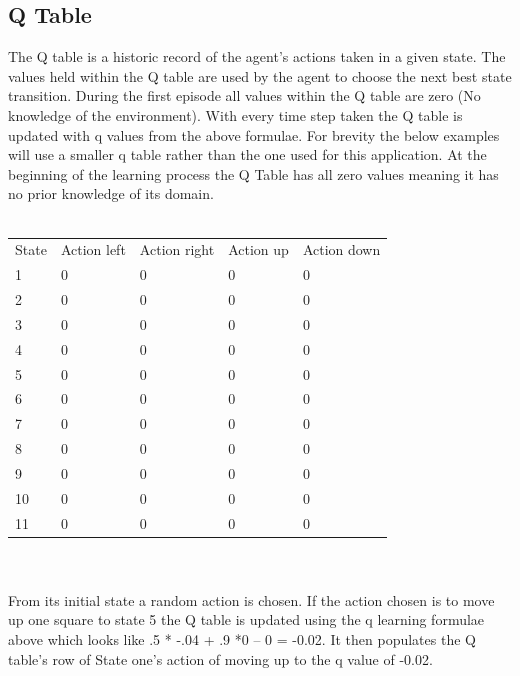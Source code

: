 \subsection{Q Table}
The Q table is a historic record of the agent’s actions taken in a given state. The values held within the Q table are used by the agent to choose the next best state transition. During the first episode all values within the Q table are zero (No knowledge of the environment). With every time step taken the Q table is updated with q values from the above formulae. For brevity the below examples will use a smaller q table rather than the one used for this application.
At the beginning of the learning process the Q Table has all zero values meaning it has no prior knowledge of its domain.
\\
\\
\begin{tabular}{lllll}
State & Action left & Action right & Action up & Action down \\
1     & 0           & 0            & 0         & 0           \\
2     & 0           & 0            & 0         & 0           \\
3     & 0           & 0            & 0         & 0           \\
4     & 0           & 0            & 0         & 0           \\
5     & 0           & 0            & 0         & 0           \\
6     & 0           & 0            & 0         & 0           \\
7     & 0           & 0            & 0         & 0           \\
8     & 0           & 0            & 0         & 0           \\
9     & 0           & 0            & 0         & 0           \\
10    & 0           & 0            & 0         & 0           \\
11    & 0           & 0            & 0         & 0          
\end{tabular}
\\
\\
From its initial state a random action is chosen. If the action chosen is to move up one square to state 5 the Q table is updated using the q learning formulae above which looks like   .5 * -.04  + .9 *0 – 0 = -0.02.
It then populates the Q table's row of State one's action of moving up to the q value of -0.02.

